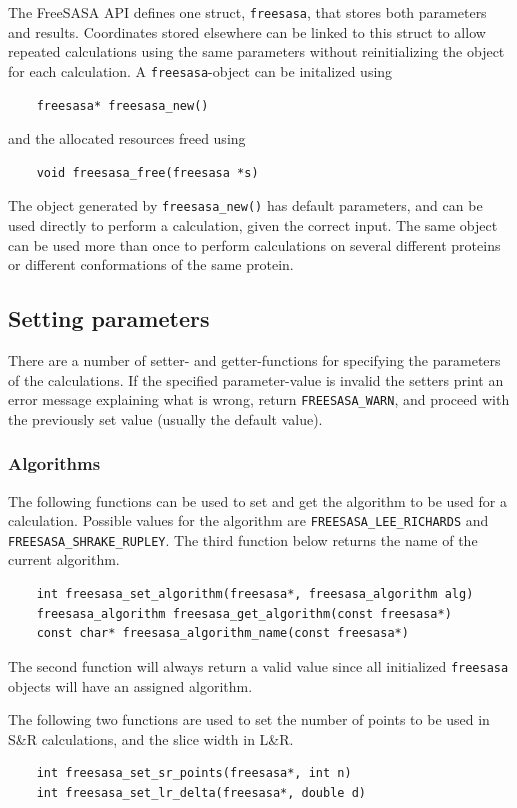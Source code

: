 \documentclass[a4paper,11pt]{article}
\begin{document}
The FreeSASA API defines one struct, \verb|freesasa|, that stores both
parameters and results. Coordinates stored elsewhere can be linked to
this struct to allow repeated calculations using the same parameters
without reinitializing the object for each calculation. A
\verb|freesasa|-object can be initalized using
\begin{verbatim}
    freesasa* freesasa_new()
\end{verbatim}
and the allocated resources freed using
\begin{verbatim}
    void freesasa_free(freesasa *s)
\end{verbatim}
The object generated by \verb|freesasa_new()| has default parameters,
and can be used directly to perform a calculation, given the correct
input. The same object can be used more than once to perform
calculations on several different proteins or different conformations
of the same protein.

\subsection{Setting parameters}

There are a number of setter- and getter-functions for specifying the
parameters of the calculations. If the specified parameter-value is
invalid the setters print an error message explaining what is wrong,
return \verb|FREESASA_WARN|, and proceed with the previously set value
(usually the default value).

\subsubsection{Algorithms}

The following functions can be used to set and get the algorithm to be
used for a calculation. Possible values for the algorithm are
\verb|FREESASA_LEE_RICHARDS| and \verb|FREESASA_SHRAKE_RUPLEY|.  The
third function below returns the name of
the current algorithm.
\begin{verbatim}
    int freesasa_set_algorithm(freesasa*, freesasa_algorithm alg)
    freesasa_algorithm freesasa_get_algorithm(const freesasa*)
    const char* freesasa_algorithm_name(const freesasa*)
\end{verbatim}
The second function will always return a valid value since all
initialized \verb|freesasa| objects will have an assigned algorithm.

The following two functions are used to set the number of
points to be used in S\&R calculations, and the slice width in L\&R.
\begin{verbatim}
    int freesasa_set_sr_points(freesasa*, int n)
    int freesasa_set_lr_delta(freesasa*, double d) 
\end{verbatim}
\end{document}
